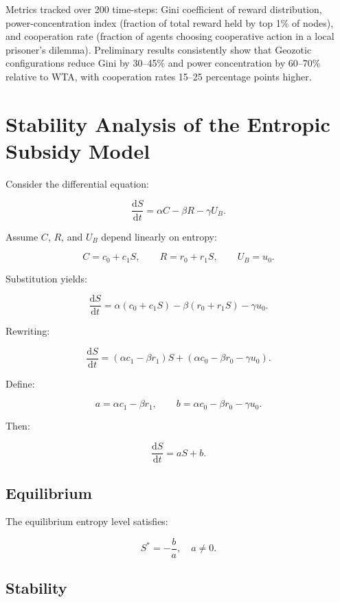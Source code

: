 \documentclass[12pt,a4paper]{article}
\theoremstyle{definition}
\newcommand{\ddt}[1]{\frac{\mathrm{d}#1}{\mathrm{d}t}}
\begin{document}
Metrics tracked over 200 time-steps: Gini coefficient of reward distribution,
power-concentration index (fraction of total reward held by top 1\% of nodes),
and cooperation rate (fraction of agents choosing cooperative action in a
local prisoner's dilemma).  Preliminary results consistently show that
Geozotic configurations reduce Gini by 30--45\% and power concentration by
60--70\% relative to WTA, with cooperation rates 15--25 percentage points
higher.

\section{Stability Analysis of the Entropic Subsidy Model}
\label{app:subsidy_stability}

Consider the differential equation:

\begin{equation}
  \ddt{S} = \alpha C - \beta R - \gamma U_B.
  \label{eq:subsidy_model_repeat}
\end{equation}

Assume $C$, $R$, and $U_B$ depend linearly on entropy:

\[
C = c_0 + c_1 S,
\qquad
R = r_0 + r_1 S,
\qquad
U_B = u_0.
\]

Substitution yields:

\begin{equation}
\ddt{S}
=
\alpha(c_0 + c_1 S)
-
\beta(r_0 + r_1 S)
-
\gamma u_0.
\end{equation}

Rewriting:

\begin{equation}
\ddt{S}
=
(\alpha c_1 - \beta r_1) S
+
(\alpha c_0 - \beta r_0 - \gamma u_0).
\end{equation}

Define:

\[
a = \alpha c_1 - \beta r_1,
\qquad
b = \alpha c_0 - \beta r_0 - \gamma u_0.
\]

Then:

\[
\ddt{S} = a S + b.
\]

\subsection*{Equilibrium}

The equilibrium entropy level satisfies:

\[
S^* = -\frac{b}{a},
\quad a \neq 0.
\]

\subsection*{Stability}
\end{document}
